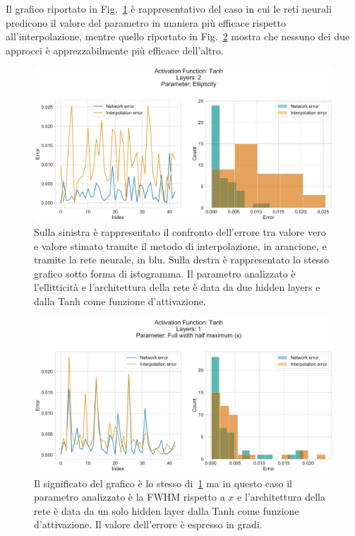 \documentclass[12pt,a4paper,final]{book}
\begin{document}
Il grafico riportato in Fig.~\ref{hist_good} è rappresentativo del caso in cui le reti neurali predicono il valore del parametro in maniera più efficace rispetto all'interpolazione, mentre quello riportato in Fig.~\ref{hist_bad} mostra che nessuno dei due approcci è apprezzabilmente più efficace dell'altro.

\begin{figure}[!ht]
	\centering
	\includegraphics[width=\linewidth]{../figures/hist_good.pdf}
	\caption{Sulla sinistra è rappresentato il confronto dell'errore tra valore vero e valore stimato tramite il metodo di interpolazione, in arancione, e tramite la rete neurale, in blu. Sulla destra è rappresentato lo stesso grafico sotto forma di istogramma. Il parametro analizzato è l'ellitticità e l'architettura della rete è data da due hidden layers e dalla Tanh come funzione d'attivazione.}
	\label{hist_good}
\end{figure}
\vspace{1cm}
\begin{figure}[!ht]
	\centering
	\includegraphics[width=\linewidth]{../figures/hist_bad.pdf}
	\caption{Il significato del grafico è lo stesso di~\ref{hist_good} ma in questo caso il parametro analizzato è la FWHM rispetto a $x$ e l'architettura della rete è data da un solo hidden layer dalla Tanh come funzione d'attivazione. Il valore dell'errore è espresso in gradi.}
	\label{hist_bad}
\end{figure}
\end{document}

